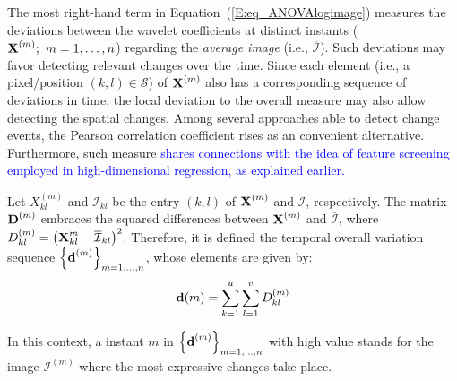 \documentclass[journal]{IEEEtran}
\newcommand{\vD}{{\textbf D}}
\newcommand{\vd}{{\textbf d}}
\newcommand{\vX}{{\textbf X}}
\begin{document}
The most right-hand term in Equation~(\ref{E:eq_ANOVAlogimage}) measures the deviations 
between the wavelet coefficients at distinct instants ($\vX^{(m)}; \ m=1,\ldots,n$) regarding the \textit{average image} (i.e., $\overline{\mathcal{I}}$). Such deviations may favor detecting relevant changes over the time. Since each element (i.e., a pixel/position $(k,l)\in \mathcal{S}$) of $\vX^{(m)}$ also has a corresponding sequence of deviations in time, the local deviation to the overall measure 
may also allow detecting the spatial changes. Among several approaches able to detect change events, the Pearson correlation coefficient rises as an convenient alternative. Furthermore, such measure \textcolor{blue}{shares connections with the idea of feature screening employed in high-dimensional regression, as explained earlier.}

Let $X_{kl}^{(m)}$ and $\overline{\mathcal{I}}_{kl}$ be the entry $(k,l)$ of $\vX^{(m)}$ and $\overline{\mathcal{I}}$, respectively. 
%
The matrix $\vD^{(m)}$ embraces the squared differences between $\vX^{(m)}$ and $\overline{\mathcal{I}}$, where $D_{kl}^{(m)} = \left( \vX_{kl}^{m} - \overline{\mathcal{I}}_{kl} \right)^2$.
%
Therefore, it is defined the temporal overall variation sequence $\left\lbrace \vd^{(m)}  \right\rbrace_{m=1,\ldots,n}$, whose elements are given by:
\begin{equation}\label{E:eq_defdm}
\vd(m)= \sum_{k=1}^{u} \sum_{l=1}^{v} D_{kl}^{(m)} %
\end{equation}


In this context, a instant $m$ in $\left\lbrace \vd^{(m)}  \right\rbrace_{m=1,\ldots,n}$ with high value stands for the image $\mathcal{I}^{(m)}$ where the most expressive changes take place.
\end{document}
